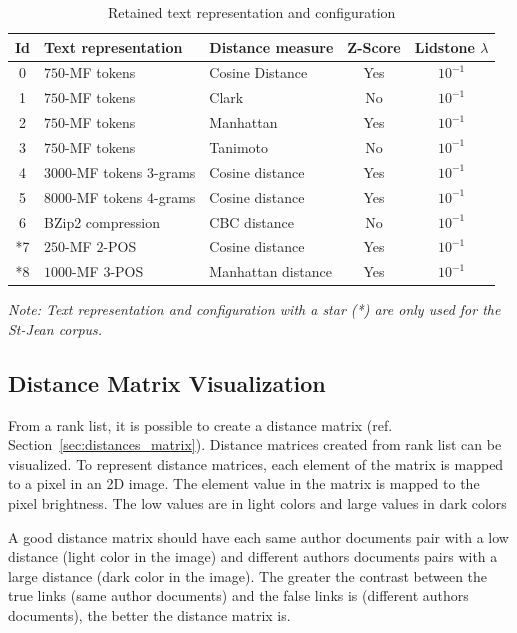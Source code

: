 \begin{table}
  \centering
  \caption{Retained text representation and configuration}
  \label{tab:9rl}
  \begin{tabular}{c l l c c}
    \toprule
    Id &
    Text representation &
    Distance measure &
    Z-Score &
    Lidstone $\lambda$\\
    \midrule
    0 & $750$-MF tokens & Cosine Distance & Yes & $10^{-1}$\\
    1 & $750$-MF tokens & Clark & No & $10^{-1}$\\
    2 & $750$-MF tokens & Manhattan & Yes & $10^{-1}$\\
    3 & $750$-MF tokens & Tanimoto & No & $10^{-1}$\\
    4 & $3000$-MF tokens $3$-grams & Cosine distance & Yes & $10^{-1}$\\
    5 & $8000$-MF tokens $4$-grams & Cosine distance & Yes & $10^{-1}$\\
    6 & BZip2 compression & CBC distance & No & $10^{-1}$\\
    *7 & $250$-MF $2$-POS & Cosine distance & Yes & $10^{-1}$\\
    *8 & $1000$-MF $3$-POS & Manhattan distance & Yes & $10^{-1}$\\
    \bottomrule
  \end{tabular}

  \vspace{0.2cm}

  \textit{Note: Text representation and configuration with a star (*) are only used for the St-Jean corpus.}\\
\end{table}

\subsection{Distance Matrix Visualization}

From a rank list, it is possible to create a distance matrix (ref. Section~\ref{sec:distances_matrix}).
Distance matrices created from rank list can be visualized.
To represent distance matrices, each element of the matrix is mapped to a pixel in an 2D image.
The element value in the matrix is mapped to the pixel brightness.
The low values are in light colors and large values in dark colors

A good distance matrix should have each same author documents pair with a low distance (light color in the image) and different authors documents pairs with a large distance (dark color in the image).
The greater the contrast between the true links (same author documents) and the false links is (different authors documents), the better the distance matrix is.

